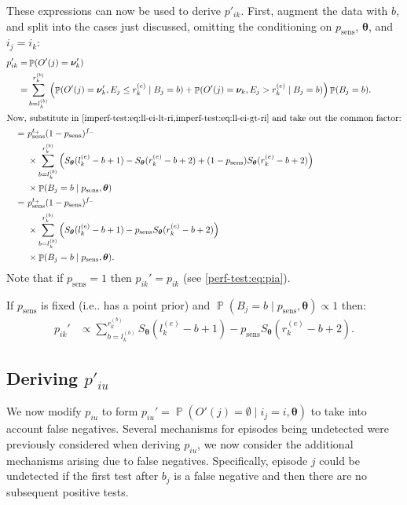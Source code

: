 \documentclass[12pt]{article}
\makeatletter
\DeclareMathOperator{\prob}{\mathbb{P}}
\renewcommand{\vec}[1]{\bm{#1}}
\newcommand{\psens}{p_\text{sens}}
\DeclareRobustCommand\onedot{\futurelet\@let@token\@onedot}
\def\@onedot{\ifx\@let@token.\else.\null\fi\xspace}
\def\ie{i.e\onedot} \def\Ie{{I.e}\onedot}
\makeatother
\begin{document}
These expressions can now be used to derive $p'_{ik}$.
First, augment the data with $b$, and split into the cases just discussed, omitting the conditioning on $\psens$, $\vec{\theta}$, and $i_j = i_k$:
\begin{align}
p_{ik}'
=& \prob(O'(j) = \vec{\nu}_k') \\
=& \sum_{b = l_k^{(b)}}^{r_k^{(b)}} \left( \prob(O'(j) = \vec{\nu}_k', E_j \leq r_k^{(e)} \mid B_j = b) + \prob(O'(j) = \vec{\nu}_k, E_j > r_k^{(e)} \mid B_j = b) \right) \prob(B_j = b). \\
\intertext{Now, substitute in \cref{imperf-test:eq:ll-ei-lt-ri,imperf-test:eq:ll-ei-gt-ri} and take out the common factor:}
=\ &  p_\text{sens}^{t_+} (1 - p_\text{sens})^{f_-} \\
 & \times \sum_{b = l_k^{(b)}}^{r_k^{(b)}} \left( S_{\vec{\theta}}(l_k^{(e)} - b + 1) - S_{\vec{\theta}}(r_k^{(e)} - b + 2) + (1 - p_\text{sens}) S_{\vec{\theta}}(r_k^{(e)} - b + 2) \right) \\ 
  & \times \prob(B_j = b \mid p_\text{sens}, \vec{\theta}) \\
=\ &  p_\text{sens}^{t_+} (1 - p_\text{sens})^{f_-} \\
  & \times \sum_{b = l_k^{(b)}}^{r_k^{(b)}} \left( S_{\vec{\theta}}(l_k^{(e)} - b + 1) - p_\text{sens} S_{\vec{\theta}}(r_k^{(e)} - b + 2) \right) \\
  & \times \prob(B_j = b \mid p_\text{sens}, \vec{\theta}).
\label{imperf-test:eq:pia-prime}
\end{align}
Note that if $p_\text{sens} = 1$ then $p_{ik}' = p_{ik}$ (see \cref{perf-test:eq:pia}).

If $\psens$ is fixed (\ie has a point prior) and $\prob(B_j = b \mid \psens, \vec{\theta}) \propto 1$ then:
\begin{align}
p_{ik}'
&\propto \sum_{b = l_k^{(b)}}^{r_k^{(b)}} S_{\vec{\theta}}(l_k^{(e)} - b + 1) - p_\text{sens} S_{\vec{\theta}}(r_k^{(e)} - b + 2).
\label{imperf-test:eq:pia-prime-constant}
\end{align}

\subsection{Deriving $p'_{iu}$} \label{imperf-test:sec:modifying-p_iu}

We now modify $p_{iu}$ to form $p_{iu}' = \prob(O'(j) = \emptyset \mid i_j = i, \vec{\theta})$ to take into account false negatives.
Several mechanisms for episodes being undetected were previously considered when deriving $p_{iu}$, we now consider the additional mechanisms arising due to false negatives.
Specifically, episode $j$ could be undetected if the first test after $b_j$ is a false negative and then there are no subsequent positive tests.
\end{document}
